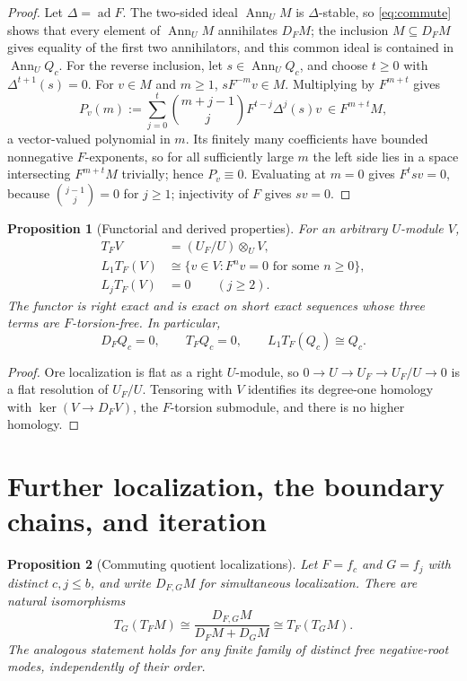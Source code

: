 \documentclass[11pt,a4paper]{article}
\newcommand{\ad}{\operatorname{ad}}
\newcommand{\Ann}{\operatorname{Ann}}
\theoremstyle{plainupright}
\newtheorem{proposition}{Proposition}[section]
\begin{document}
\begin{proof}
Let \(\Delta=\ad F\). The two-sided ideal \(\Ann_UM\) is \(\Delta\)-stable, so
\eqref{eq:commute} shows that every element of \(\Ann_UM\) annihilates
\(D_FM\); the inclusion \(M\subseteq D_FM\) gives equality of the first two
annihilators, and this common ideal is contained in \(\Ann_UQ_c\). For the
reverse inclusion, let \(s\in\Ann_UQ_c\), and choose \(t\ge0\) with
\(\Delta^{t+1}(s)=0\). For \(v\in M\) and \(m\ge1\), \(sF^{-m}v\in M\).
Multiplying by \(F^{m+t}\) gives
\[
P_v(m):=\sum_{j=0}^t\binom{m+j-1}{j}F^{t-j}\Delta^j(s)v
\ \in F^{m+t}M,
\]
a vector-valued polynomial in \(m\). Its finitely many coefficients have
bounded nonnegative \(F\)-exponents, so for all sufficiently large \(m\) the
left side lies in a space intersecting \(F^{m+t}M\) trivially; hence
\(P_v\equiv0\). Evaluating at \(m=0\) gives \(F^tsv=0\), because
\(\binom{j-1}{j}=0\) for \(j\ge1\); injectivity of \(F\) gives \(sv=0\).
\end{proof}

\begin{proposition}[Functorial and derived properties]\label{prop:derived}
For an arbitrary \(U\)-module \(V\),
\begin{align*}
T_FV&=(U_F/U)\otimes_UV,\\
L_1T_F(V)&\cong\{v\in V:F^nv=0\text{ for some }n\ge0\},\\
L_jT_F(V)&=0\qquad(j\ge2).
\end{align*}
The functor is right exact and is exact on short exact sequences whose three
terms are \(F\)-torsion-free. In particular,
\[
D_FQ_c=0,\qquad T_FQ_c=0,\qquad L_1T_F(Q_c)\cong Q_c.
\]
\end{proposition}

\begin{proof}
Ore localization is flat as a right \(U\)-module, so
\(0\to U\to U_F\to U_F/U\to0\) is a flat resolution of \(U_F/U\). Tensoring
with \(V\) identifies its degree-one homology with
\(\ker(V\to D_FV)\), the \(F\)-torsion submodule, and there is no higher
homology.
\end{proof}

\section{Further localization, the boundary chains, and iteration}\label{sec:chains}

\begin{proposition}[Commuting quotient localizations]\label{prop:commuting}
Let \(F=f_c\) and \(G=f_j\) with distinct \(c,j\le b\), and write
\(D_{F,G}M\) for simultaneous localization. There are natural isomorphisms
\[
T_G(T_FM)\cong
\frac{D_{F,G}M}{D_FM+D_GM}
\cong T_F(T_GM).
\]
The analogous statement holds for any finite family of distinct free
negative-root modes, independently of their order.
\end{proposition}
\end{document}
